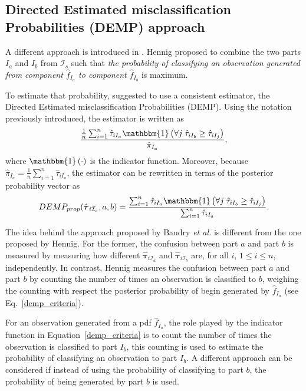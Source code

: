 \documentclass[10pt, a4paper]{article}
\newcommand{\m}[1]{\boldsymbol{#1}}
\begin{document}
\subsection{Directed Estimated misclassification Probabilities (DEMP) approach}

A different approach is introduced in \cite{hennig2010methods}. Hennig proposed to combine the two parts $I_a$ and $I_b$ from $ \mathcal{I}_s$ such that \emph{the probability of classifying an observation generated from component $\hat{f}_{I_a}$ to component $\hat{f}_{I_b}$} is maximum. 

To estimate that probability,  \cite{hennig2010methods} suggested to use a consistent estimator, the Directed Estimated misclassification Probabilities (DEMP). Using the notation previously introduced, the estimator is written as
\[
\frac{ \frac{1}{n} \sum_{i=1}^n {\hat{\tau}_{iI_a} \mathbbm{1}\left( \forall j\; \hat{\tau}_{i I_{b}} \geq \hat{\tau}_{iI_j} \right)}}{ \hat{\pi}_{I_a}},
\]
where $\mathbbm{1}\left( \cdot \right)$ is the indicator function. Moreover, because $ \hat{\pi}_{I_a} = \frac{1}{n} \sum_{i=1}^n \hat{\tau}_{iI_a}$, the estimator can be rewritten in terms of the posterior probability vector as
\begin{equation}\label{demp_criteria}
DEMP_{prop}(\hat{\m \tau}_{i \mathcal{I}_s}, a, b) =\frac{ \sum_{i=1}^n {\hat{\tau}_{iI_a} \mathbbm{1}\left( \forall j\; \hat{\tau}_{i I_{b}} \geq \hat{\tau}_{iI_j} \right)}}{\sum_{i=1}^n \hat{\tau}_{iI_a} }.
\end{equation}

The idea behind the approach proposed by Baudry \emph{et al.} is different from the one proposed by Hennig. For the former, the confusion between part $a$ and part $b$ is measured by measuring how different $\hat{\m \tau}_{i \mathcal{I}_a}$ and $\hat{\m \tau}_{i \mathcal{I}_b}$ are, for all $i$, $1\leq i \leq n$, independently. In contrast, Hennig measures the confusion between part $a$ and part $b$ by counting the number of times an observation is classified to $b$, weighing the counting with respect the posterior probability of begin generated by $\hat{f}_{I_a}$ (see Eq.~\ref{demp_criteria}).

For an observation generated from a pdf $\hat{f}_{I_a}$, the role played by the indicator function in Equation~\ref{demp_criteria} is to count the number of times the observation is classified to part $I_b$, this counting is used to estimate the probability of classifying an observation to part $I_b$. A different approach can be considered if instead of using the probability of classifying to part $b$, the probability of being generated by part $b$ is used.
\end{document}
